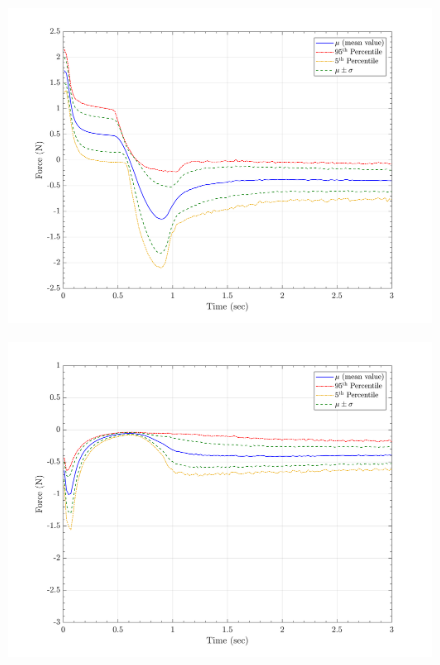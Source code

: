 \documentclass{article}
\begin{document}
\begin{figure}[H]
        \begin{minipage}[b]{0.5\linewidth}
                \centering
                \includegraphics[width=1\textwidth]{InclinedPlane/GlobalRecords/C_Global_Fx.png}
                \label{fig:Ramp-SP-Fx-C}
        \end{minipage}
        \begin{minipage}[b]{0.5\linewidth}
                \centering
                \includegraphics[width=1\textwidth]{InclinedPlane/GlobalRecords/C_Global_Fy.png}
                \label{fig:Ramp-SP-Fy-C}
        \end{minipage}


\end{figure}
\end{document}
